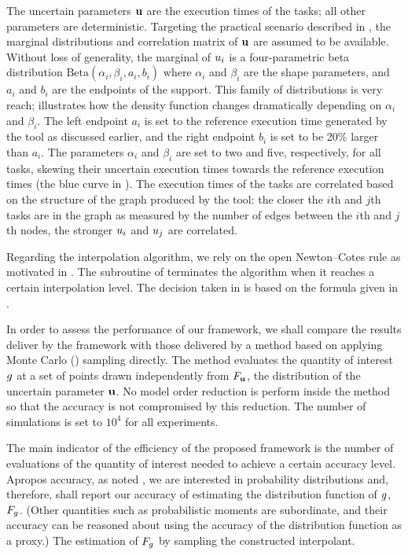 
The uncertain parameters $\mathbf{u}$ are the execution times of the tasks; all other
parameters are deterministic. Targeting the practical scenario described in
, the marginal distributions and correlation matrix
of $\mathbf{u}$ are assumed to be available. Without loss of generality, the marginal
of $u_i$ is a four-parametric beta distribution $\text{Beta}(\alpha_i, \beta_i,
a_i, b_i)$ where $\alpha_i$ and $\beta_i$ are the shape parameters, and $a_i$
and $b_i$ are the endpoints of the support. This family of distributions is very
reach;  illustrates how the density function changes
dramatically depending on $\alpha_i$ and $\beta_i$. The left endpoint $a_i$ is
set to the reference execution time generated by the  tool as discussed
earlier, and the right endpoint $b_i$ is set to be 20\% larger than $a_i$. The
parameters $\alpha_i$ and $\beta_i$ are set to two and five, respectively, for
all tasks, skewing their uncertain execution times towards the reference
execution times (the blue curve in ). The execution times of
the tasks are correlated based on the structure of the graph produced by the
 tool: the closer the $i$th and $j$th tasks are in the graph as
measured by the number of edges between the $i$th and $j$th nodes, the stronger
$u_i$ and $u_j$ are correlated.

Regarding the interpolation algorithm, we rely on the open Newton--Cotes rule as
motivated in . The  subroutine of
 terminates the algorithm when it reaches a certain
interpolation level. The decision taken in  is based on the
formula given in .

In order to assess the performance of our framework, we shall compare the
results deliver by the framework with those delivered by a method based on
applying Monte Carlo () sampling directly. The  method evaluates
the quantity of interest $g$ at a set of points drawn independently from
$F_{\mathbf{u}}$, the distribution of the uncertain parameter $\mathbf{u}$. No model
order reduction is perform inside the  method so that the accuracy is not
compromised by this reduction. The number of  simulations is set to
$10^4$ for all experiments.

The main indicator of the efficiency of the proposed framework is the number of
evaluations of the quantity of interest needed to achieve a certain accuracy
level. Apropos accuracy, as noted , we are interested in
probability distributions and, therefore, shall report our accuracy of
estimating the distribution function of $g$, $F_g$. (Other
quantities such as probabilistic moments are subordinate, and their accuracy can
be reasoned about using the accuracy of the distribution function as a proxy.)
The estimation of $F_g$ by sampling the constructed interpolant.

